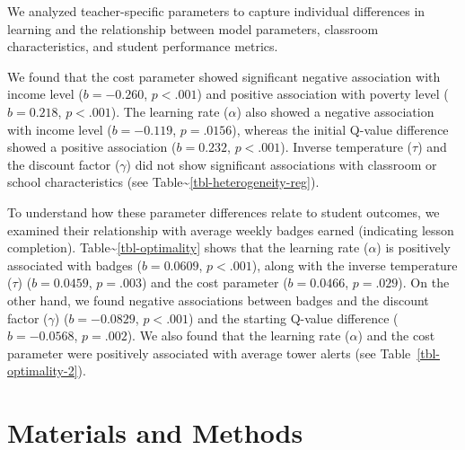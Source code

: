 \documentclass[
  number,
  preprint,
  3p,
  onecolumn]{elsarticle}
\begin{document}
We analyzed teacher-specific parameters to capture individual
differences in learning and the relationship between model parameters,
classroom characteristics, and student performance metrics.

We found that the cost parameter showed significant negative association
with income level (\(b = -0.260\), \(p < .001\)) and positive
association with poverty level (\(b = 0.218\), \(p < .001\)). The
learning rate (\(\alpha\)) also showed a negative association with
income level (\(b = -0.119\), \(p = .0156\)), whereas the initial
Q-value difference showed a positive association (\(b = 0.232\),
\(p < .001\)). Inverse temperature (\(\tau\)) and the discount factor
(\(\gamma\)) did not show significant associations with classroom or
school characteristics (see
Table\textasciitilde{}\ref{tbl-heterogeneity-reg}).

To understand how these parameter differences relate to student
outcomes, we examined their relationship with average weekly badges
earned (indicating lesson completion).
Table\textasciitilde{}\ref{tbl-optimality} shows that the learning rate
(\(\alpha\)) is positively associated with badges (\(b = 0.0609\),
\(p < .001\)), along with the inverse temperature (\(\tau\))
(\(b = 0.0459\), \(p = .003\)) and the cost parameter (\(b = 0.0466\),
\(p = .029\)). On the other hand, we found negative associations between
badges and the discount factor (\(\gamma\)) (\(b = -0.0829\),
\(p < .001\)) and the starting Q-value difference (\(b = -0.0568\),
\(p = .002\)). We also found that the learning rate (\(\alpha\)) and the
cost parameter were positively associated with average tower alerts (see
Table~\ref{tbl-optimality-2}).

\section{Materials and Methods}\label{materials-and-methods}
\end{document}
